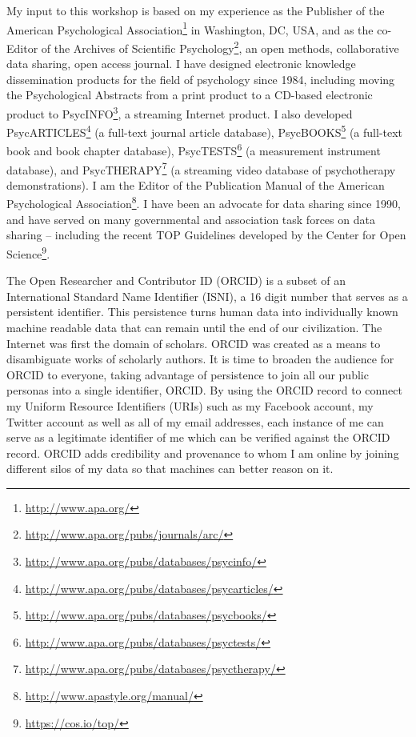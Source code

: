\documentclass[a4paper,UKenglish]{dagrep}
\begin{document}
{}
\license
My input to this workshop is based on my experience as the Publisher of the
American Psychological Association\footnote{\url{http://www.apa.org/}} in
Washington, DC, USA, and as the co-Editor of the Archives of Scientific
Psychology\footnote{\url{http://www.apa.org/pubs/journals/arc/}}, an open
methods, collaborative data sharing, open access journal.  I have designed
electronic knowledge dissemination products for the field of psychology since
1984, including moving the Psychological Abstracts from a print product to a
CD-based electronic product to
PsycINFO\footnote{\url{http://www.apa.org/pubs/databases/psycinfo/}}, a
streaming Internet product.  I also developed
PsycARTICLES\footnote{\url{http://www.apa.org/pubs/databases/psycarticles/}} (a
full-text journal article database),
PsycBOOKS\footnote{\url{http://www.apa.org/pubs/databases/psycbooks/}} (a
full-text book and book chapter database),
PsycTESTS\footnote{\url{http://www.apa.org/pubs/databases/psyctests/}} (a
measurement instrument database), and
PsycTHERAPY\footnote{\url{http://www.apa.org/pubs/databases/psyctherapy/}} (a
streaming video database of psychotherapy demonstrations).  I am the Editor of
the Publication Manual of the American Psychological
Association\footnote{\url{http://www.apastyle.org/manual/}}.  I have been an
advocate for data sharing since 1990, and have served on many governmental and
association task forces on data sharing – including the recent TOP Guidelines
developed by the Center for Open Science\footnote{\url{https://cos.io/top/}}.   


{}
\license
The Open Researcher and Contributor ID (ORCID) is a subset of an International 
Standard Name Identifier (ISNI), a 16 digit number that serves as a persistent 
identifier.  This persistence turns human data into individually known machine 
readable data that can remain until the end of our civilization.  The Internet was 
first the domain of scholars.  ORCID was created as a means to disambiguate 
works of scholarly authors.  It is time to broaden the audience for ORCID to 
everyone, taking advantage of persistence to join all our public personas into a 
single identifier, ORCID.  By using the ORCID record to connect my Uniform 
Resource Identifiers (URIs) such as my Facebook account, my Twitter account as 
well as all of my email addresses, each instance of me can serve as a legitimate 
identifier of me which can be verified against the ORCID record.  ORCID adds 
credibility and provenance to whom I am online by joining different silos of my 
data so that machines can better reason on it.
\end{document}
